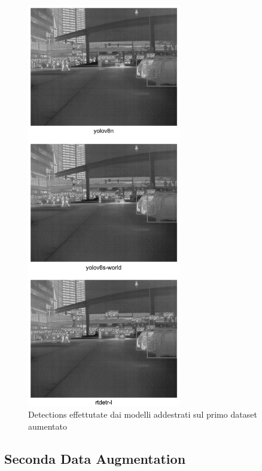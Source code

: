 \clearpage

\begin{figure}[ht]
    \centering
    \includegraphics[width=0.6\textwidth]{files/capitoli/4-sperimentazione-risultati/assets/augmented-data-1-detections.png}
    \caption{\label{fig:augmented-data-1-detections}Detections effettutate dai modelli addestrati sul primo dataset aumentato}
\end{figure}

\clearpage

\subsection{Seconda Data Augmentation}

